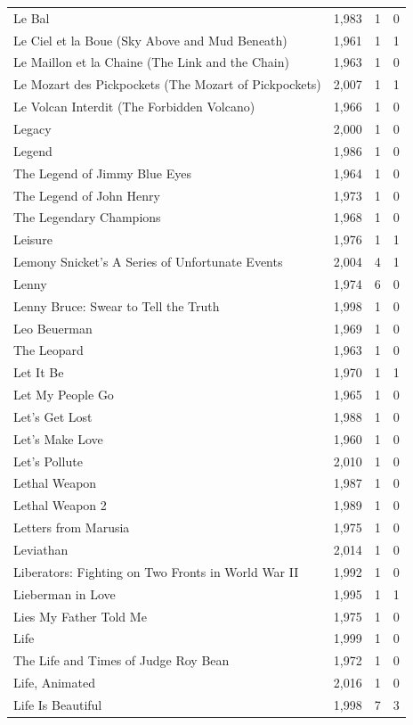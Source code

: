 \begin{tabular}{lrrr}
Le Bal & 1,983 & 1 & 0 \\
Le Ciel et la Boue (Sky Above and Mud Beneath) & 1,961 & 1 & 1 \\
Le Maillon et la Chaine (The Link and the Chain) & 1,963 & 1 & 0 \\
Le Mozart des Pickpockets (The Mozart of Pickpockets) & 2,007 & 1 & 1 \\
Le Volcan Interdit (The Forbidden Volcano) & 1,966 & 1 & 0 \\
Legacy & 2,000 & 1 & 0 \\
Legend & 1,986 & 1 & 0 \\
The Legend of Jimmy Blue Eyes & 1,964 & 1 & 0 \\
The Legend of John Henry & 1,973 & 1 & 0 \\
The Legendary Champions & 1,968 & 1 & 0 \\
Leisure & 1,976 & 1 & 1 \\
Lemony Snicket's A Series of Unfortunate Events & 2,004 & 4 & 1 \\
Lenny & 1,974 & 6 & 0 \\
Lenny Bruce: Swear to Tell the Truth & 1,998 & 1 & 0 \\
Leo Beuerman & 1,969 & 1 & 0 \\
The Leopard & 1,963 & 1 & 0 \\
Let It Be & 1,970 & 1 & 1 \\
Let My People Go & 1,965 & 1 & 0 \\
Let's Get Lost & 1,988 & 1 & 0 \\
Let's Make Love & 1,960 & 1 & 0 \\
Let's Pollute & 2,010 & 1 & 0 \\
Lethal Weapon & 1,987 & 1 & 0 \\
Lethal Weapon 2 & 1,989 & 1 & 0 \\
Letters from Marusia & 1,975 & 1 & 0 \\
Leviathan & 2,014 & 1 & 0 \\
Liberators: Fighting on Two Fronts in World War II & 1,992 & 1 & 0 \\
Lieberman in Love & 1,995 & 1 & 1 \\
Lies My Father Told Me & 1,975 & 1 & 0 \\
Life & 1,999 & 1 & 0 \\
The Life and Times of Judge Roy Bean & 1,972 & 1 & 0 \\
Life, Animated & 2,016 & 1 & 0 \\
Life Is Beautiful & 1,998 & 7 & 3 \\

\end{tabular}
